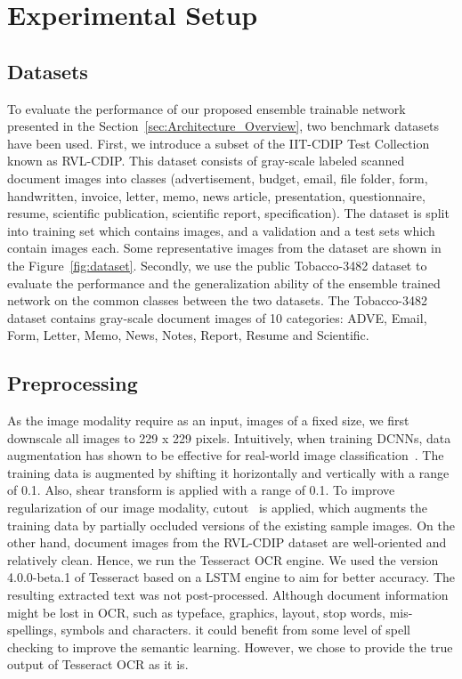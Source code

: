 \documentclass[twocolumn]{svjour3}
\begin{document}
\section{Experimental Setup}
\label{sec:Experimental Setup}
\subsection{Datasets}

To evaluate the performance of our proposed ensemble trainable network presented in the Section~\ref{sec:Architecture_Overview}, two benchmark datasets have been used. First, we introduce a subset of the IIT-CDIP Test Collection known as RVL-CDIP. This dataset consists of gray-scale labeled scanned document images into  classes (advertisement, budget, email, file folder, form, handwritten, invoice, letter, memo, news article, presentation, questionnaire, resume, scientific publication, scientific report, specification). The dataset is split into training set which contains  images, and  a validation and a test sets which contain  images each. Some representative images from the dataset are shown in the Figure~\ref{fig:dataset}.
Secondly, we use the public Tobacco-3482 dataset to evaluate the performance and the generalization ability of the ensemble trained network on the common classes between the two datasets. The Tobacco-3482 dataset contains  gray-scale document images of 10 categories: ADVE, Email, Form, Letter, Memo, News, Notes, Report, Resume and Scientific. 

\subsection{Preprocessing}

As the image modality require as an input, images of a fixed size, we first downscale all images to 229 x 229 pixels. Intuitively, when training DCNNs, data augmentation has shown to be effective for real-world image classification~\cite{Krizhevsky2017ImageNetCW}. The training data is augmented by shifting it horizontally and vertically with a range of 0.1. Also, shear transform is applied with a range of 0.1. To improve regularization of our image modality, cutout~\cite{devries2017improved} is applied, which augments the training data by partially occluded versions of the existing sample images.
On the other hand, document images from the RVL-CDIP dataset are well-oriented and relatively clean. Hence, we run the Tesseract OCR engine. We used the version 4.0.0-beta.1 of Tesseract based on a LSTM engine to aim for better accuracy. The resulting extracted text was not post-processed. Although document information might be lost in OCR, such as typeface, graphics, layout, stop words, mis-spellings, symbols and characters. it could benefit from some level of spell checking to improve the semantic learning. However, we chose to provide the true output of Tesseract OCR as it is.
\end{document}
